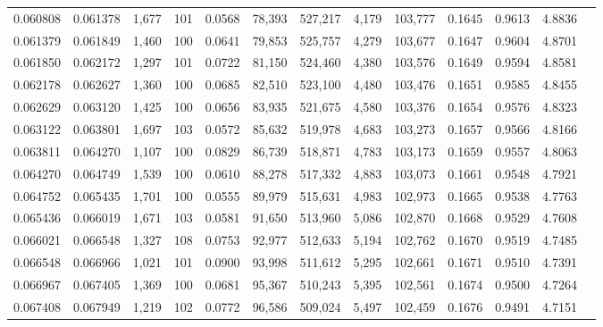\begin{tabular}{rrrrrrrrrrrrr}
0.060808 & 0.061378 & 1,677 & 101 &                                     0.0568 &  78,393 & 527,217 &   4,179 & 103,777 & 0.1645 & 0.9613 & 4.8836 \\
0.061379 & 0.061849 & 1,460 & 100 &                                     0.0641 &  79,853 & 525,757 &   4,279 & 103,677 & 0.1647 & 0.9604 & 4.8701 \\
0.061850 & 0.062172 & 1,297 & 101 &                                     0.0722 &  81,150 & 524,460 &   4,380 & 103,576 & 0.1649 & 0.9594 & 4.8581 \\
0.062178 & 0.062627 & 1,360 & 100 &                                     0.0685 &  82,510 & 523,100 &   4,480 & 103,476 & 0.1651 & 0.9585 & 4.8455 \\
0.062629 & 0.063120 & 1,425 & 100 &                                     0.0656 &  83,935 & 521,675 &   4,580 & 103,376 & 0.1654 & 0.9576 & 4.8323 \\
0.063122 & 0.063801 & 1,697 & 103 &                                     0.0572 &  85,632 & 519,978 &   4,683 & 103,273 & 0.1657 & 0.9566 & 4.8166 \\
0.063811 & 0.064270 & 1,107 & 100 &                                     0.0829 &  86,739 & 518,871 &   4,783 & 103,173 & 0.1659 & 0.9557 & 4.8063 \\
0.064270 & 0.064749 & 1,539 & 100 &                                     0.0610 &  88,278 & 517,332 &   4,883 & 103,073 & 0.1661 & 0.9548 & 4.7921 \\
0.064752 & 0.065435 & 1,701 & 100 &                                     0.0555 &  89,979 & 515,631 &   4,983 & 102,973 & 0.1665 & 0.9538 & 4.7763 \\
0.065436 & 0.066019 & 1,671 & 103 &                                     0.0581 &  91,650 & 513,960 &   5,086 & 102,870 & 0.1668 & 0.9529 & 4.7608 \\
0.066021 & 0.066548 & 1,327 & 108 &                                     0.0753 &  92,977 & 512,633 &   5,194 & 102,762 & 0.1670 & 0.9519 & 4.7485 \\
0.066548 & 0.066966 & 1,021 & 101 &                                     0.0900 &  93,998 & 511,612 &   5,295 & 102,661 & 0.1671 & 0.9510 & 4.7391 \\
0.066967 & 0.067405 & 1,369 & 100 &                                     0.0681 &  95,367 & 510,243 &   5,395 & 102,561 & 0.1674 & 0.9500 & 4.7264 \\
0.067408 & 0.067949 & 1,219 & 102 &                                     0.0772 &  96,586 & 509,024 &   5,497 & 102,459 & 0.1676 & 0.9491 & 4.7151 \\

\end{tabular}
